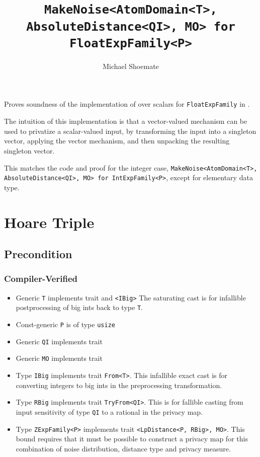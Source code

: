 \documentclass{article}
\title{\texttt{MakeNoise<AtomDomain<T>, AbsoluteDistance<QI>, MO> for FloatExpFamily<P>}}
\author{Michael Shoemate}
\date{}
\begin{document}
\maketitle

\contrib
Proves soundness of the implementation of  over scalars
for \texttt{FloatExpFamily} in .

The intuition of this implementation is that a vector-valued mechanism can be used to privatize a scalar-valued input,
by transforming the input into a singleton vector, 
applying the vector mechanism, and then unpacking the resulting singleton vector.

This matches the code and proof for the integer case, \texttt{MakeNoise<AtomDomain<T>, AbsoluteDistance<QI>, MO> for IntExpFamily<P>},
except for elementary data type.

\section{Hoare Triple}
\subsection*{Precondition}
\subsubsection*{Compiler-Verified}

\begin{itemize}
    \item Generic \texttt{T} implements trait  and \texttt{<IBig>}
        The saturating cast is for infallible postprocessing of big ints back to type \texttt{T}.
    \item Const-generic \texttt{P} is of type \texttt{usize}
    \item Generic \texttt{QI} implements trait 
    \item Generic \texttt{MO} implements trait 
    \item Type \texttt{IBig} implements trait \texttt{From<T>}.
        This infallible exact cast is for converting integers to big ints in the preprocessing transformation.
    \item Type \texttt{RBig} implements trait \texttt{TryFrom<QI>}.
        This is for fallible casting from input sensitivity of type \texttt{QI} to a rational in the privacy map.
    \item Type \texttt{ZExpFamily<P>} implements trait \texttt{<LpDistance<P, RBig>, MO>}.
        This bound requires that it must be possible to construct a privacy map for this combination of noise distribution, distance type and privacy measure.
\end{itemize}
\end{document}
